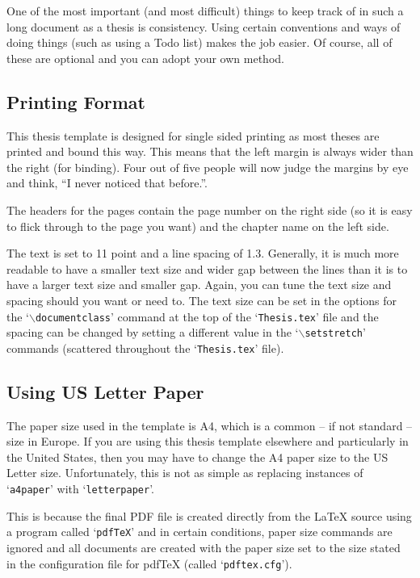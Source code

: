 One of the most important (and most difficult) things to keep track of in such a long document as a thesis is consistency. Using certain conventions and ways of doing things (such as using a Todo list) makes the job easier. Of course, all of these are optional and you can adopt your own method.

\subsection{Printing Format}

This thesis template is designed for single sided printing as most theses are printed and bound this way. This means that the left margin is always wider than the right (for binding). Four out of five people will now judge the margins by eye and think, ``I never 
noticed that before.''.

The headers for the pages contain the page number on the right side (so it is easy to flick through to the page you want) and the chapter name on the left side.

The text is set to 11 point and a line spacing of 1.3. Generally, it is much more readable to have a smaller text size and wider gap between the lines than it is to have a larger text size and smaller gap. Again, you can tune the text size and spacing should you want or need to. The text size can be set in the options for the `$\backslash$\texttt{documentclass}' command at the top of the `\texttt{Thesis.tex}' file and the spacing can be changed by setting a different value in the `$\backslash$\texttt{setstretch}' commands (scattered throughout the `\texttt{Thesis.tex}' file).

\subsection{Using US Letter Paper}

The paper size used in the template is A4, which is a common -- if not standard -- size in Europe. If you are using this thesis template elsewhere and particularly in the United States, then you may have to change the A4 paper size to the US Letter size. Unfortunately, this is not as simple as replacing instances of `\texttt{a4paper}' with `\texttt{letterpaper}'.

This is because the final PDF file is created directly from the \LaTeX{} source using a program called `\texttt{pdfTeX}' and in certain conditions, paper size commands are ignored and all documents are created with the paper size set to the size stated in the configuration file for pdfTeX (called `\texttt{pdftex.cfg}').

